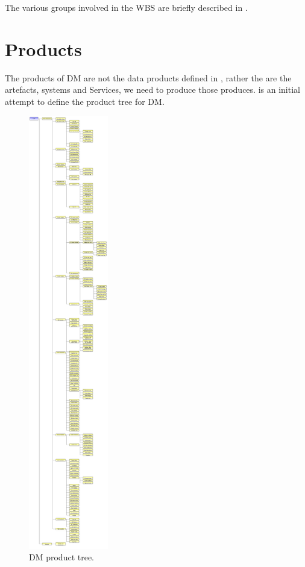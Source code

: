The various groups involved in the WBS are briefly described in .

\section {Products} \label{sect:products}

The products of DM are not the data products defined in , rather the are the artefacts, systems and Services,  we need to produce those produces.  is an initial attempt to define the product tree for DM. 

\begin{figure}[htbp]
\begin{center}
 \includegraphics[height=19cm]{ProductTree}
\caption{DM product tree. \label{fig:prods}}
\end{center}
\end{figure}


